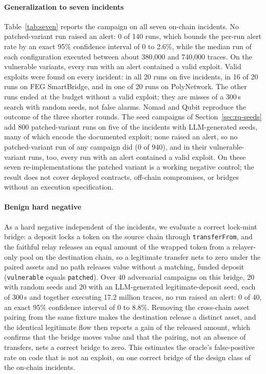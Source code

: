 \documentclass[a4paper]{cas-sc}
\begin{document}
\paragraph{Generalization to seven incidents}
Table~\ref{tab:seven} reports the campaign on all seven on-chain incidents. No patched-variant run raised an alert: 0 of 140 runs, which bounds the per-run alert rate by an exact 95\% confidence interval of 0 to 2.6\%, while the median run of each configuration executed between about 380{,}000 and 740{,}000 traces. On the vulnerable variants, every run with an alert contained a valid exploit. Valid exploits were found on every incident: in all 20 runs on five incidents, in 16 of 20 runs on FEG SmartBridge, and in one of 20 runs on PolyNetwork. The other runs ended at the budget without a valid exploit; they are misses of a 300\,s search with random seeds, not false alarms. Nomad and Qubit reproduce the outcome of the three shorter rounds. The seed campaigns of Section~\ref{sec:rq-seeds} add 800 patched-variant runs on five of the incidents with LLM-generated seeds, many of which encode the documented exploit; none raised an alert, so no patched-variant run of any campaign did (0 of 940), and in their vulnerable-variant runs, too, every run with an alert contained a valid exploit. On these seven re-implementations the patched variant is a working negative control; the result does not cover deployed contracts, off-chain compromises, or bridges without an execution specification.

\paragraph{Benign hard negative}
As a hard negative independent of the incidents, we evaluate a correct lock-mint bridge: a deposit locks a token on the source chain through \texttt{transferFrom}, and the faithful relay releases an equal amount of the wrapped token from a relayer-only pool on the destination chain, so a legitimate transfer nets to zero under the paired assets and no path releases value without a matching, funded deposit (\texttt{vulnerable} equals \texttt{patched}). Over 40 adversarial campaigns on this bridge, 20 with random seeds and 20 with an LLM-generated legitimate-deposit seed, each of 300\,s and together executing 17.2 million traces, no run raised an alert: 0 of 40, an exact 95\% confidence interval of 0 to 8.8\%. Removing the cross-chain asset pairing from the same fixture makes the destination release a distinct asset, and the identical legitimate flow then reports a gain of the released amount, which confirms that the bridge moves value and that the pairing, not an absence of transfers, nets a correct bridge to zero. This estimates the oracle's false-positive rate on code that is not an exploit, on one correct bridge of the design class of the on-chain incidents.
\end{document}
